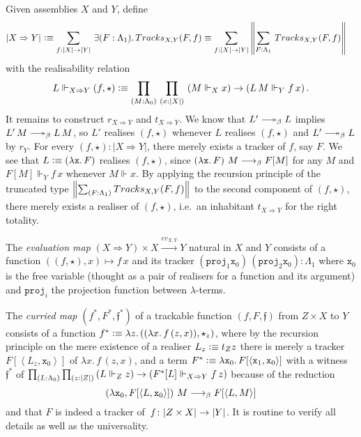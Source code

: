 \documentclass[a4paper,UKenglish,numberwithinsect,cleveref,thm-restate]{lipics-v2021}
\numberwithin{equation}{section}
\theoremstyle{definition}
\theoremstyle{plain}
\begin{document}
\begin{example}[$\PP$-Exponential]
  Given assemblies $X$ and $Y$, define
  \begin{align*}
    \bproj{X \Rightarrow Y} & \defeq \sm{f : |X| \to |Y|} \exis{F : \Lambda_1} \mathsf{Tracks}_{X, Y}(F, f) \equiv \sm{f : |X| \to |Y|} \brck{\sm{F : \Lambda_1} \mathsf{Tracks}_{X, Y}(F, f) }
  \end{align*}
  with the realisability relation 
  \[
    L \Vdash_{X \Rightarrow Y} (f, \star) \defeq \prd{M : \Lambda_0}{x : |X|} \left( M \Vdash_X x\right) \to \left(L\,M \Vdash_Y f\,x\right).
  \]
  It remains to construct $r_{X\Rightarrow Y}$ and $t_{X \Rightarrow Y}$. 
  We know that $L' \reduce L$ implies $L'\,M \reduce L\,M$, so $L'$ realises $(f, \star)$ whenever $L$ realises $(f, \star)$ and $L' \reduce L$ by $r_Y$.
  For every $(f, \star) : |X \Rightarrow Y|$, there merely exists a tracker of $f$, say $F$.
  We see that $L \vcentcolon\equiv \left(\mathtt{\lambda x}.\,F\right)$ realises $(f, \star)$, since
  $\left(\mathtt{\lambda x}.\,F\right)\,M \longrightarrow_{\beta} F[M]$ for any $M$ and $F[M] \Vdash_Y f\,x$ whenever $M \Vdash x$.
  By applying the recursion principle of the truncated type $\brck{\sm{F : \Lambda_1} \mathsf{Tracks}_{X, Y}(F, f) }$ to the second component of $(f, \star)$, there merely exists a realiser of $(f, \star)$, i.e.\ an inhabitant $t_{X \Rightarrow Y}$ for the right totality.

  The \emph{evaluation map} $(X \Rightarrow Y) \times X \xrightarrow{ev_{X, Y}} Y$ natural in $X$ and $Y$ consists of a function
  $((f, \star) , x) \mapsto f\,x$ and its tracker $(\mathtt{proj}_1 \mathtt{x}_0)\,(\mathtt{proj}_2 \mathtt{x}_0) : \Lambda_1$ where $\mathtt{x}_0$ is the free variable (thought as a pair of realisers for a function and its argument) and $\mathtt{proj}_i$ the projection function between $\lambda$-terms.

  The \emph{curried map} $(f^*, F^*, \mathfrak{f}^*)$ of a trackable function $(f, F, \mathfrak{f})$ from $Z \times X$ to $Y$ consists of
    a function
      $f^* \vcentcolon\equiv \lambda z.\, ((\lambda x.\, f\,(z, x)) , \star_z)$, 
      where by the recursion principle on the mere existence of a realiser $L_z \vcentcolon\equiv t_Z z$ there is merely a tracker~$F[\left< L_z , \mathtt{x}_0 \right>]$ of $\lambda x.\, f\,(z, x)$, and
    a term $F^* \vcentcolon\equiv \lambda \mathtt{x}_0.\, F[ \left< \mathtt{x}_1, \mathtt{x}_0 \right> ]$ with 
    a witness $\mathfrak{f}^*$ of $\prd{L : \Lambda_0}{z : |Z|} \left(L \Vdash_Z z\right) \to \left(F^*[L] \Vdash_{X \Rightarrow Y} f\, z\right)$ because of the reduction
      \[
        \left(\lambda \mathtt{x}_0, F[\left< L , \mathtt{x}_0 \right>]\right)\,M \longrightarrow_{\beta} F[\left< L , M \right>]
      \]
      and that $F$ is indeed a tracker of~$f\colon \mathopen{}\left|Z \times X\right|_{}^{}\mathclose{} \to \mathopen{}\left|Y\right|_{}^{}\mathclose{}$. 
  It is routine to verify all details as well as the universality.
\end{example}
\end{document}
